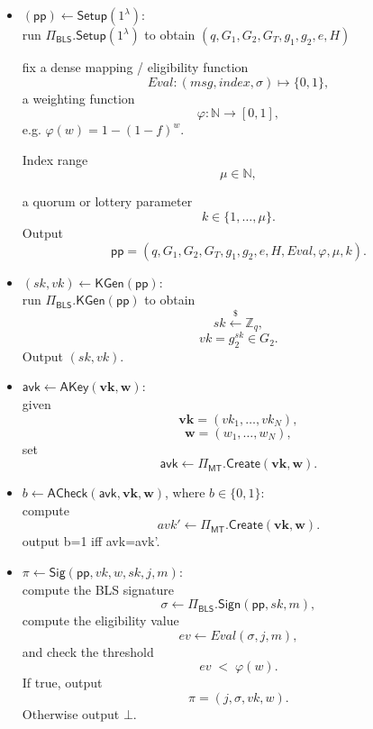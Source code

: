 \documentclass{article}
\begin{document}
\begin{itemize}

  \item $(\mathsf{pp}) \leftarrow \mathsf{Setup}(1^\lambda)$:\\
        run $\Pi_{\mathsf{BLS}}.\mathsf{Setup}(1^\lambda)$ to obtain $(q,G_1,G_2,G_T,g_1,g_2,e,H)$
        
        fix a dense mapping / eligibility function
        \[
        Eval : ( msg, index, \sigma) \mapsto \{0,1\},
        \]
        a weighting function
        \[
          \varphi : \mathbb{N} \to [0,1],
        \]
        e.g. $\varphi(w) = 1-(1-f)^w$.

        Index range
        \[
          \mu \in \mathbb{N}, 
        \]

        a quorum or lottery parameter
        \[
          k \in \{1,\dots,\mu\}.
        \]
        Output
        \[
          \mathsf{pp}=(q,G_1,G_2,G_T,g_1,g_2,e,H,Eval,\varphi,\mu,k).
        \]

  \item $(sk,vk) \leftarrow \mathsf{KGen}(\mathsf{pp})$:\\
        run $\Pi_{\mathsf{BLS}}.\mathsf{KGen}(\mathsf{pp})$ to obtain
        \[
          sk \xleftarrow{\$} \mathbb{Z}_q,
        \]
        \[
          vk = g_2^{sk} \in G_2.
        \]
        Output $(sk,vk)$.

  \item $\mathsf{avk} \leftarrow \mathsf{AKey}(\mathbf{vk},\mathbf{w})$:\\
        given
        \[
          \mathbf{vk}=(vk_1,\dots,vk_N),
        \]
        \[
          \mathbf{w}=(w_1,\dots,w_N),
        \]
        set
        \[
          \mathsf{avk} \leftarrow \Pi_{\mathsf{MT}}.\mathsf{Create}(\mathbf{vk},\mathbf{w}).
        \]

  \item $b \leftarrow \mathsf{ACheck}(\mathsf{avk},\mathbf{vk},\mathbf{w})$, where $b\in\{0,1\}$:\\
        compute
        \[
          avk' \leftarrow \Pi_{\mathsf{MT}}.\mathsf{Create}(\mathbf{vk},\mathbf{w}).
        \]
        output b=1 iff avk=avk'. 

  \item $\pi \leftarrow \mathsf{Sig}(\mathsf{pp}, vk, w, sk, j, m)$:\\
        compute the BLS signature
        \[
          \sigma \leftarrow \Pi_{\mathsf{BLS}}.\mathsf{Sign}(\mathsf{pp}, sk, m),
        \]
        compute the eligibility value
        \[
          ev \leftarrow Eval(\sigma, j, m),
        \]
        and check the threshold
        \[
          ev \;<\;  \varphi(w).
        \]
        If true, output
        \[
          \pi=(j, \sigma, vk, w).
        \]
        Otherwise output $\bot$.





\end{itemize}
\end{document}
